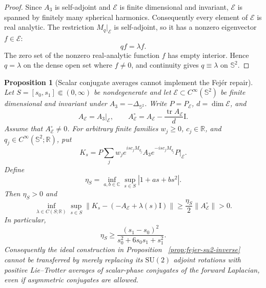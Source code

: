\documentclass[11pt]{article}
\newtheorem{proposition}[theorem]{Proposition}
\theoremstyle{remark}
\newcommand{\Id}{\mathrm I}
\begin{document}
\begin{proof}
Since $A_3$ is self-adjoint and $\mathcal E$ is finite dimensional and
invariant, $\mathcal E$ is spanned by finitely many spherical harmonics.
Consequently every element of $\mathcal E$ is real analytic.  The restriction
$M_q|_{\mathcal E}$ is self-adjoint, so it has a nonzero eigenvector
$f\in\mathcal E$:
\[
 qf=\lambda f.
\]
The zero set of the nonzero real-analytic function $f$ has empty interior.
Hence $q=\lambda$ on the dense open set where $f\neq0$, and continuity gives
$q\equiv\lambda$ on $\mathbb S^2$.
\end{proof}

\begin{proposition}[Scalar conjugate averages cannot implement the Fej\'er repair]
\label{prop:scalar-conjugate-average-no-go}
Let $S=[s_0,s_1]\Subset(0,\infty)$ be nondegenerate and let
$\mathcal E\subset C^\infty(\mathbb S^2)$ be finite dimensional and invariant
under $A_3=-\Delta_{\mathbb S^2}$.  Write $P=P_{\mathcal E}$,
$d=\dim\mathcal E$, and
\[
 A_{\mathcal E}=A_3|_{\mathcal E},
 \qquad
 A_{\mathcal E}^{\circ}
 =A_{\mathcal E}-\frac{\operatorname{tr}A_{\mathcal E}}d\Id.
\]
Assume that $A_{\mathcal E}^{\circ}\neq0$.  For arbitrary finite families
$w_j\geq0$, $c_j\in\mathbb R$, and
$q_j\in C^\infty(\mathbb S^2;\mathbb R)$, put
\begin{equation}
 K_s=
 P\sum_jw_j
 e^{isc_jM_{q_j}}A_3e^{-isc_jM_{q_j}}
 P\bigg|_{\mathcal E}.
 \label{eq:scalar-adjoint-average}
\end{equation}
Define
\begin{equation}
 \eta_S=
 \inf_{a,b\in\mathbb C}
 \sup_{s\in S}|1+as+bs^2|.
 \label{eq:quadratic-constant-gap}
\end{equation}
Then $\eta_S>0$ and
\begin{equation}
 \inf_{\lambda\in C(S;\mathbb R)}
 \sup_{s\in S}
 \|K_s-(-A_{\mathcal E}+\lambda(s)\Id)\|
 \geq
 \frac{\eta_S}{2}
 \|A_{\mathcal E}^{\circ}\|>0.
 \label{eq:scalar-fejer-average-gap}
\end{equation}
In particular,
\begin{equation}
 \eta_S\geq
 \frac{(s_1-s_0)^2}{s_0^2+6s_0s_1+s_1^2}.
 \label{eq:explicit-quadratic-gap}
\end{equation}
Consequently the ideal construction in Proposition
~\ref{prop:fejer-su2-inverse} cannot be transferred by merely replacing its
$\mathrm{SU}(2)$ adjoint rotations with positive Lie--Trotter averages of
scalar-phase conjugates of the forward Laplacian, even if asymmetric
conjugates are allowed.
\end{proposition}
\end{document}
